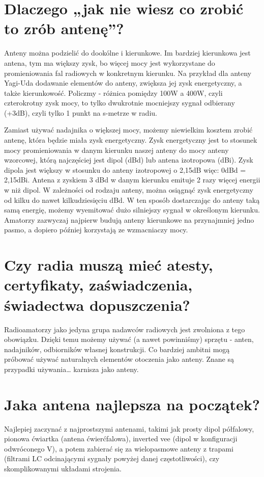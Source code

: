\documentclass[a4paper,12pt]{article}
\begin{document}
\section{Dlaczego „jak nie wiesz co zrobić to zrób antenę”?}
Anteny można podzielić do dookólne i kierunkowe. Im bardziej kierunkowa jest antena, tym ma większy zysk, bo więcej mocy jest wykorzystane do promieniowania fal radiowych w konkretnym kierunku. Na przykład dla anteny Yagi-Uda dodawanie elementów do anteny, zwiększa jej zysk energetyczny, a także kierunkowość.
Policzmy - różnica pomiędzy 100W a 400W, czyli czterokrotny zysk mocy, to tylko dwukrotnie mocniejszy sygnał odbierany (+3dB), czyli tylko 1 punkt na s-metrze w radiu. 

Zamiast używać nadajnika o większej mocy, możemy niewielkim kosztem zrobić antenę, która będzie miała zysk energetyczny. Zysk energetyczny jest to stosunek mocy promieniowania w danym kierunku naszej anteny do mocy anteny wzorcowej, którą najczęściej jest dipol (dBd) lub antena izotropowa (dBi). Zysk dipola jest większy w stosunku do anteny izotropowej o 2,15dB więc: 0dBd = 2,15dBi. Antena z zyskiem 3 dBd w danym kierunku emituje 2 razy więcej energii w niż dipol. W zależności od rodzaju anteny, można osiągnąć zysk energetyczny od kilku do nawet kilkudziesięciu dBd. W ten sposób dostarczając do anteny taką samą energię, możemy wyemitować dużo silniejszy sygnał w określonym kierunku. Amatorzy zazwyczaj najpierw budują anteny kierunkowe na przynajmniej jedno pasmo, a dopiero później korzystają ze wzmacniaczy mocy.

\section{Czy radia muszą mieć atesty, certyfikaty, zaświadczenia, świadectwa dopuszczenia?}
Radioamatorzy jako jedyna grupa nadawców radiowych jest zwolniona z tego obowiązku. Dzięki temu możemy używać (a nawet powinniśmy) sprzętu - anten, nadajników, odbiorników własnej konstrukcji. Co bardziej ambitni mogą próbować używać naturalnych elementów otoczenia jako anteny. Znane są przypadki używania… karnisza jako anteny.

\section{Jaka antena najlepsza na początek?}
Najlepiej zaczynać z najprostszymi antenami, takimi jak prosty dipol półfalowy, pionowa ćwiartka (antena ćwierćfalowa), inverted vee (dipol w konfiguracji odwróconego V), a potem zabierać się za wielopasmowe anteny z trapami (filtrami LC odcinającymi sygnały powyżej danej częstotliwości), czy skomplikowanymi układami strojenia.
\end{document}
